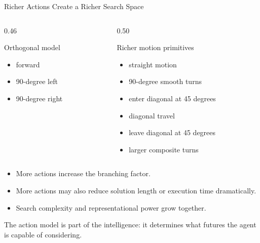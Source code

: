 \documentclass[aspectratio=169,10pt]{beamer}
\begin{document}
\begin{frame}[shrink=20]{Richer Actions Create a Richer Search Space}
  \begin{columns}[T,onlytextwidth]
    \begin{column}{0.46\textwidth}
      \begin{block}{Orthogonal model}
        \begin{itemize}
          \item forward
          \item 90-degree left
          \item 90-degree right
        \end{itemize}
      \end{block}
    \end{column}

    \begin{column}{0.50\textwidth}
      \begin{block}{Richer motion primitives}
        \begin{itemize}
          \item straight motion
          \item 90-degree smooth turns
          \item enter diagonal at 45 degrees
          \item diagonal travel
          \item leave diagonal at 45 degrees
          \item larger composite turns
        \end{itemize}
      \end{block}
    \end{column}
  \end{columns}

  \begin{itemize}
    \item More actions increase the branching factor.
    \item More actions may also reduce solution length or execution time dramatically.
    \item Search complexity and representational power grow together.
  \end{itemize}

  \begin{keyidea}
    The action model is part of the intelligence: it determines what futures the agent is capable of considering.
  \end{keyidea}
\end{frame}
\end{document}
